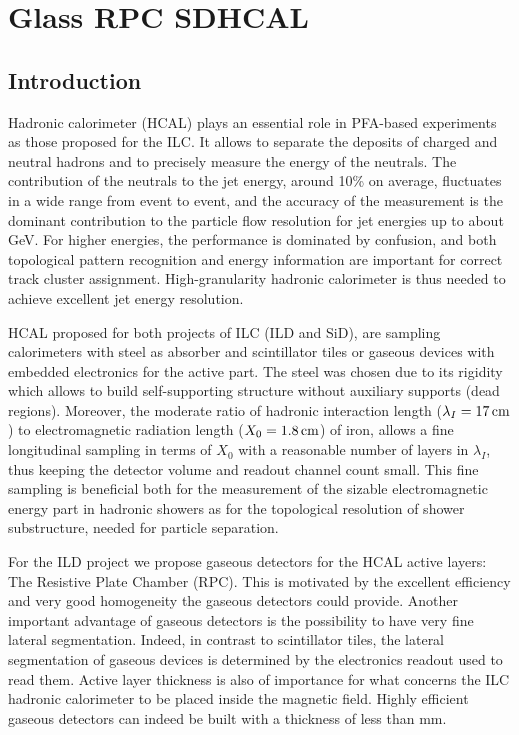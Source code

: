 \section{Glass RPC SDHCAL}
\subsection{Introduction}

Hadronic calorimeter (HCAL) plays an essential role in PFA-based experiments as
those proposed for the ILC. It allows to separate the deposits of charged and
neutral hadrons and to precisely measure the energy of the neutrals. The
contribution of the neutrals to the jet energy, around 10\% on average,
fluctuates in a wide range from event to event, and the accuracy of the
measurement is the dominant contribution to the particle flow resolution for jet
energies up to about \unit[100]{GeV}. For higher energies, the performance is
dominated by confusion, and both topological pattern recognition and energy
information are important for correct track cluster assignment.
High-granularity hadronic calorimeter is thus needed to achieve excellent jet
energy resolution.

HCAL proposed for both projects of ILC (ILD and SiD), are sampling calorimeters
with steel as absorber and scintillator tiles or gaseous devices with embedded
electronics for the active part. The steel was chosen due to its rigidity which
allows to build self-supporting structure without auxiliary supports (dead
regions). Moreover, the moderate ratio of hadronic interaction length
($\lambda_I = \unit[17]{cm}$) to electromagnetic radiation length ($X_0 = \unit[1.8]{cm}$) of
iron, allows a fine longitudinal sampling in terms of $X_0$ with a reasonable
number of layers in $\lambda_I$, thus keeping the detector volume and readout
channel count small. This fine sampling is beneficial both for the measurement
of the sizable electromagnetic energy part in hadronic showers as for the
topological resolution of shower substructure, needed for particle separation.

For the ILD project we propose gaseous detectors for the HCAL active layers: The
Resistive Plate Chamber (RPC). This is motivated by the excellent efficiency
and very good homogeneity the gaseous detectors could provide. Another
important advantage of gaseous detectors is the possibility to have very fine
lateral segmentation. Indeed, in contrast to scintillator tiles, the lateral
segmentation of gaseous devices is determined by the electronics readout used to
read them. Active layer thickness is also of importance for what concerns the
ILC hadronic calorimeter to be placed inside the magnetic field. Highly
efficient gaseous detectors can indeed be built with a thickness of less than
\unit[3]{mm}.

